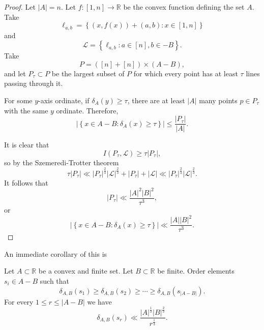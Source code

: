 \documentclass[12pt,reqno]{amsart}
\begin{document}
\begin{proof}
Let \(\left\lvert A \right\rvert  = n\). Let \(f: [1,n] \to \mathbb{R} \) be the convex
function defining the set \(A\). Take
\[
    \ell _{a,b} = \left\{ \left( x,f(x) \right) + (a,b) : x \in [1,n] \right\} 
\]
and
\[
    \mathcal{L} = \left\{ \ell _{a,b} : a \in [n] , b \in -B \right\} 
.\]
Take
\[
    P = \left( [n] + [n]  \right) \times \left( A - B \right) 
,\]
and let \(P_{\tau}  \subset P\) be the largest subset of \(P\) for which every
point has at least \(\tau\) lines passing through it. 

For some \(y\)-axis ordinate, if \(\delta_{A} (y) \geq \tau\), there are at least
\(\left\lvert A \right\rvert \) many points \(p \in P_{\tau} \) with the same
\(y\) ordinate. Therefore,
\[
   \left\lvert  \left\{ x \in A -B : \delta_{A} (x) \geq \tau \right\}  \right\rvert \leq \frac{\left\lvert P_{\tau}  \right\rvert }{\left\lvert A \right\rvert } 
.\]

It is clear that
\[
    I(P_{\tau} , \mathcal{L} ) \geq \tau \left\lvert P_{\tau}  \right\rvert 
,\]
so by the Szemeredi-Trotter theorem
\[
    \tau\left\lvert P_{\tau}  \right\rvert \ll \left\lvert P_{\tau}  \right\rvert ^{\frac{2}{3} } \left\lvert \mathcal{L}  \right\rvert ^{\frac{2}{3} } + \left\lvert P_{\tau}  \right\rvert + \left\lvert \mathcal{L}  \right\rvert \ll \left\lvert P_{\tau}  \right\rvert ^{\frac{2}{3} } \left\lvert \mathcal{L}  \right\rvert ^{\frac{2}{3} } 
.\]
It follows that
\[
    \left\lvert P_{\tau}  \right\rvert \ll \frac{\left\lvert A \right\rvert ^{2} \left\lvert B \right\rvert ^{2} }{\tau^{3} } 
,\]
or
\[
    \left\lvert  \left\{ x \in A -B : \delta_{A} (x) \geq \tau \right\}  \right\rvert \ll \frac{\left\lvert A \right\rvert \left\lvert B \right\rvert ^{2} }{\tau^{3} } 
.\]
\end{proof}

An immediate corollary of this is

\begin{corollary}\label{cor:szt-delta}
Let \(A \subset \mathbb{R} \) be a convex and finite set. Let \(B \subset \mathbb{R} \) be finite.
Order elements \(s_{i} \in A-B\) such that 
\[
    \delta_{A,B} (s_1) \geq \delta_{A,B} (s_2) \geq \cdots \geq \delta_{A,B} (s _{\left\lvert A - B \right\rvert } )
.\]
For every \(1 \leq r \leq \left\lvert A - B \right\rvert\) we have
\[
    \delta_{A,B} (s _{r} ) \ll \frac{\left\lvert A \right\rvert^{\frac{1}{3} } \left\lvert B \right\rvert ^{\frac{2}{3} } }{r^{\frac{1}{3} }}
.\]
\end{corollary}
\end{document}
